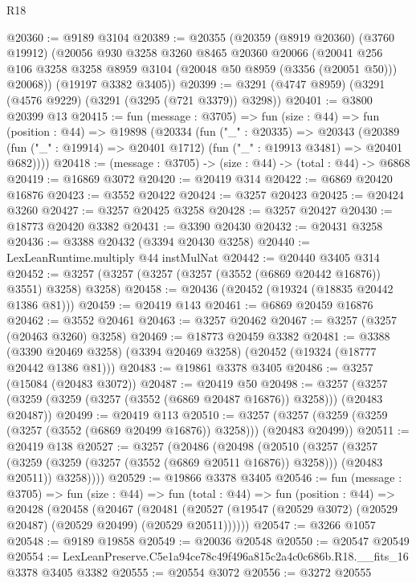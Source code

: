 \begin{lexlean}{R18}
\begin{coremodule}
@20360 := @9189 @3104
@20389 := @20355
    (@20359
      (@8919 @20360)
      (@3760 @19912)
      (@20056
        @930
        @3258
        @3260
        @8465
        @20360
        @20066
        (@20041 @256 @106 @3258 @3258 @8959 @3104 (@20048 @50 @8959 (@3356 (@20051 @50))) @20068))
      (@19197 @3382 @3405))
@20399 := @3291 (@4747 @8959) (@3291 (@4576 @9229) (@3291 (@3295 (@721 @3379)) @3298))
@20401 := @3800 @20399 @13
@20415 := fun (message : @3705) =>
  fun (size : @44) =>
  fun (position : @44) =>
  @19898
    (@20334
      (fun ("_" : @20335) =>
      @20343
        (@20389 (fun ("_" : @19914) => @20401 @1712) (fun ("_" : @19913 @3481) => @20401 @682))))
@20418 := (message : @3705) -> (size : @44) -> (total : @44) -> @6868
@20419 := @16869 @3072
@20420 := @20419 @314
@20422 := @6869 @20420 @16876
@20423 := @3552 @20422
@20424 := @3257 @20423
@20425 := @20424 @3260
@20427 := @3257 @20425 @3258
@20428 := @3257 @20427
@20430 := @18773 @20420 @3382
@20431 := @3390 @20430
@20432 := @20431 @3258
@20436 := @3388 @20432 (@3394 @20430 @3258)
@20440 := LexLeanRuntime.multiply @44 instMulNat
@20442 := @20440 @3405 @314
@20452 := @3257 (@3257 (@3257 (@3257 (@3552 (@6869 @20442 @16876)) @3551) @3258) @3258)
@20458 := @20436 (@20452 (@19324 (@18835 @20442 @1386 @81)))
@20459 := @20419 @143
@20461 := @6869 @20459 @16876
@20462 := @3552 @20461
@20463 := @3257 @20462
@20467 := @3257 (@3257 (@20463 @3260) @3258)
@20469 := @18773 @20459 @3382
@20481 := @3388
    (@3390 @20469 @3258)
    (@3394 @20469 @3258)
    (@20452 (@19324 (@18777 @20442 @1386 @81)))
@20483 := @19861 @3378 @3405
@20486 := @3257 (@15084 (@20483 @3072))
@20487 := @20419 @50
@20498 := @3257 (@3257 (@3259 (@3259 (@3257 (@3552 (@6869 @20487 @16876)) @3258))) (@20483 @20487))
@20499 := @20419 @113
@20510 := @3257 (@3257 (@3259 (@3259 (@3257 (@3552 (@6869 @20499 @16876)) @3258))) (@20483 @20499))
@20511 := @20419 @138
@20527 := @3257
    (@20486
      (@20498
        (@20510
          (@3257
            (@3257 (@3259 (@3259 (@3257 (@3552 (@6869 @20511 @16876)) @3258))) (@20483 @20511))
            @3258))))
@20529 := @19866 @3378 @3405
@20546 := fun (message : @3705) =>
  fun (size : @44) =>
  fun (total : @44) =>
  fun (position : @44) =>
  @20428
    (@20458
      (@20467
        (@20481 (@20527 (@19547 (@20529 @3072) (@20529 @20487) (@20529 @20499) (@20529 @20511))))))
@20547 := @3266 @1057
@20548 := @9189 @19858
@20549 := @20036 @20548
@20550 := @20547 @20549
@20554 := LexLeanPreserve.C5e1a94ce78c49f496a815c2a4c0c686b.R18.__fits_16 @3378 @3405 @3382
@20555 := @20554 @3072
@20556 := @3272 @20555

\end{coremodule}
\end{lexlean}
